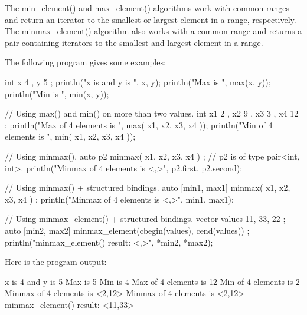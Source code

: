 The min\_element() and max\_element() algorithms work with common ranges and return an iterator to the smallest or largest element in a range, respectively. The minmax\_element() algorithm also works with a common range and returns a pair containing iterators to the smallest and largest element in a range.

The following program gives some examples:

\begin{cpp}
int x { 4 }, y { 5 };
println("x is {} and y is {}", x, y);
println("Max is {}", max(x, y));
println("Min is {}", min(x, y));

// Using max() and min() on more than two values.
int x1 { 2 }, x2 { 9 }, x3 { 3 }, x4 { 12 };
println("Max of 4 elements is {}", max({ x1, x2, x3, x4 }));
println("Min of 4 elements is {}", min({ x1, x2, x3, x4 }));

// Using minmax().
auto p2 { minmax({ x1, x2, x3, x4 }) }; // p2 is of type pair<int, int>.
println("Minmax of 4 elements is <{},{}>", p2.first, p2.second);

// Using minmax() + structured bindings.
auto [min1, max1] { minmax({ x1, x2, x3, x4 }) };
println("Minmax of 4 elements is <{},{}>", min1, max1);

// Using minmax_element() + structured bindings.
vector values { 11, 33, 22 };
auto [min2, max2] { minmax_element(cbegin(values), cend(values)) };
println("minmax_element() result: <{},{}>", *min2, *max2);
\end{cpp}

Here is the program output:

\begin{shell}
x is 4 and y is 5
Max is 5
Min is 4
Max of 4 elements is 12
Min of 4 elements is 2
Minmax of 4 elements is <2,12>
Minmax of 4 elements is <2,12>
minmax_element() result: <11,33>
\end{shell}

